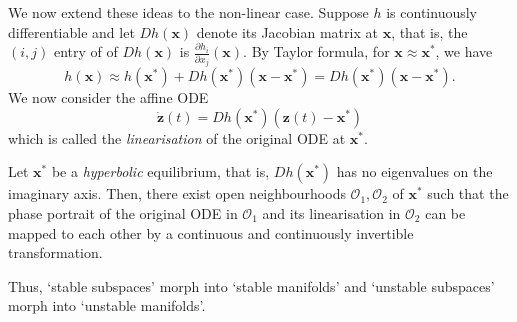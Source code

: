 \medskip

We now extend these ideas to the non-linear case. Suppose $h$ is continuously differentiable and let $Dh(\mathbf{x})$ denote its Jacobian matrix at $\mathbf{x}$, that is, the $(i,j)$ entry of of $Dh(\mathbf{x})$ is $\frac{\partial h_i}{\partial x_j}(\mathbf{x})$. By Taylor formula, for $\mathbf{x} \approx \mathbf{x}^*$, we have
\[
    h(\mathbf{x}) \approx h(\mathbf{x}^*) + Dh(\mathbf{x}^*)(\mathbf{x} - \mathbf{x}^*) = Dh(\mathbf{x}^*)(\mathbf{x} - \mathbf{x}^*).
\]
We now consider the affine ODE
\[
    \dot{\mathbf{z}}(t) = Dh(\mathbf{x}^*) \left( \mathbf{z}(t) - \mathbf{x}^* \right)
\]  
which is called the \emph{linearisation} of the original ODE at $\mathbf{x}^*$.


\begin{thm}
    Let $\mathbf{x}^*$ be a \emph{hyperbolic} equilibrium, that is, $Dh(\mathbf{x}^*)$ has no eigenvalues on the imaginary axis. Then, there exist open neighbourhoods $\mathcal{O}_1, \mathcal{O}_2$ of $\mathbf{x}^*$ such that the phase portrait of the original ODE in $\mathcal{O}_1$ and its linearisation in $\mathcal{O}_2$ can be mapped to each other by a continuous and continuously invertible transformation.
\end{thm}
Thus, `stable subspaces' morph into `stable manifolds' and `unstable subspaces' morph into `unstable manifolds'.
